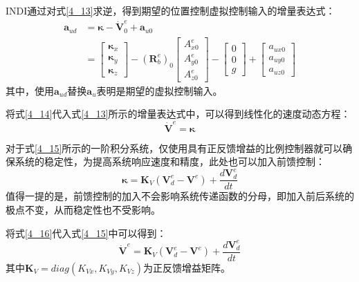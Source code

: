 INDI通过对式\eqref{4_13}求逆，得到期望的位置控制虚拟控制输入的增量表达式： 
\begin{equation}
    \begin{aligned}
        \boldsymbol{a}_{ud}&=\boldsymbol{\kappa}-\boldsymbol{\dot{V}}^e_0+\boldsymbol{a}_{u0}\\
        &=\begin{bmatrix}\boldsymbol{\kappa}_x \\\boldsymbol{\kappa}_y \\\boldsymbol{\kappa}_z\end{bmatrix}-
        (\boldsymbol{R}_b^e)_0\begin{bmatrix}A_{x0}^e \\A_{y0}^e \\A_{z0}^e\end{bmatrix}-
        \begin{bmatrix}0 \\0 \\g\end{bmatrix}+
        \begin{bmatrix}a_{ux0} \\a_{uy0} \\a_{uz0}\end{bmatrix}
    \end{aligned}
    \label{4_14}
\end{equation}
其中，使用$\boldsymbol{a}_{ud}$替换$\boldsymbol{a}_{u}$表明是期望的虚拟控制输入。

将式\eqref{4_14}代入式\eqref{4_13}所示的增量表达式中，可以得到线性化的速度动态方程：
\begin{equation}
    \dot{\boldsymbol V}^e=\boldsymbol{\kappa}
    \label{4_15}
\end{equation}

对于式\eqref{4_15}所示的一阶积分系统，仅使用具有正反馈增益的比例控制器就可以确保系统的稳定性，为提高系统响应速度和精度，此处也可以加入前馈控制：
\begin{equation}
    \boldsymbol{\kappa}=\boldsymbol{K}_{V}(\boldsymbol{V}_d^e-\boldsymbol{V}^e)+\frac{d\boldsymbol{V}^e_d}{dt}
    \label{4_16}
\end{equation}
值得一提的是，前馈控制的加入不会影响系统传递函数的分母，即加入前后系统的极点不变，从而稳定性也不受影响。

将式\eqref{4_16}代入式\eqref{4_15}中可以得到：
\begin{equation}
    \dot{\boldsymbol V}^e=\boldsymbol{K}_{V}(\boldsymbol{V}_d^e-\boldsymbol{V}^e)+\frac{d\boldsymbol{V}^e_d}{dt}
    \label{4_17}
\end{equation}
其中$\boldsymbol{K}_V=diag({K}_{V x},{K}_{V y},{K}_{V z})$为正反馈增益矩阵。


